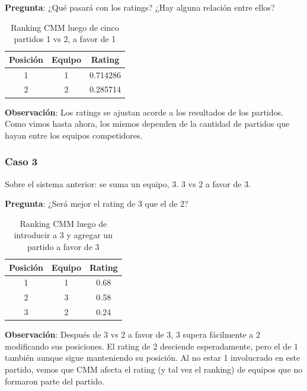 \textbf{Pregunta}: ¿Qué pasará con los ratings? ¿Hay alguna relación entre ellos?

\begin{table}[h!]
    \begin{center}
        \begin{tabular}{|c|c|c|}
        \hline
        \textbf{Posición} & \textbf{Equipo} & \textbf{Rating} \\
        \hline
        1 & 1 & 0.714286\\
        2 & 2 & 0.285714\\
        \hline
        \end{tabular}
        \caption{Ranking CMM luego de cinco partidos 1 vs 2, a favor de 1}
        \label{cmm_caso_2}
    \end{center}
\end{table}

\textbf{Observación}: Los ratings se ajustan acorde a los resultados de los partidos. Como vimos hasta ahora, los mismos dependen de la cantidad de partidos que hayan entre los equipos competidores.

\subsubsection*{Caso 3}

Sobre el sistema anterior: se suma un equipo, 3. 3 vs 2 a favor de 3.

\textbf{Pregunta}: ¿Será mejor el rating de 3 que el de 2?

\begin{table}[h!]
    \begin{center}
        \begin{tabular}{|c|c|c|}
        \hline
        \textbf{Posición} & \textbf{Equipo} & \textbf{Rating} \\
        \hline
        1 & 1 & 0.68\\
        2 & 3 & 0.58\\
        3 & 2 & 0.24\\
        \hline
        \end{tabular}
        \caption{Ranking CMM luego de introducir a 3 y agregar un partido a favor de 3}
        \label{cmm_caso_3}
    \end{center}
\end{table}

\textbf{Observación}: Después de 3 vs 2 a favor de 3, 3 supera fácilmente a 2 modificando sus posiciones. El rating de 2 desciende esperadamente, pero el de 1 también aunque sigue manteniendo su posición. Al no estar 1 involucrado en este partido, vemos que CMM afecta el rating (y tal vez el ranking) de equipos que no formaron parte del partido.

